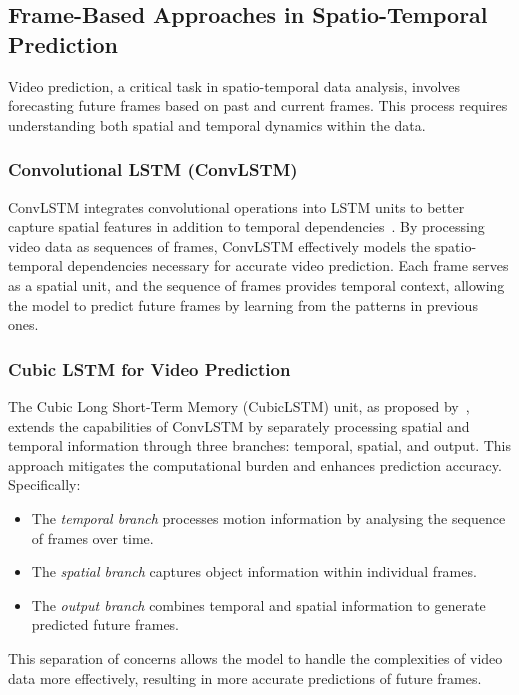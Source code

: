 \documentclass[12pt,oneside]{book} %
\begin{document}
\subsection*{Frame-Based Approaches in Spatio-Temporal Prediction}

Video prediction, a critical task in spatio-temporal data analysis, involves
forecasting future frames based on past and current frames. This process
requires understanding both spatial and temporal dynamics within the data.

\subsubsection*{Convolutional LSTM (ConvLSTM)}

ConvLSTM integrates convolutional operations into LSTM units to better capture
spatial features in addition to temporal dependencies~\cite{ConvLSTM}. By
processing video data as sequences of frames, ConvLSTM effectively models the
spatio-temporal dependencies necessary for accurate video prediction. Each
frame serves as a spatial unit, and the sequence of frames provides temporal
context, allowing the model to predict future frames by learning from the
patterns in previous ones.

\subsubsection*{Cubic LSTM for Video Prediction}

The Cubic Long Short-Term Memory (CubicLSTM) unit, as proposed
by~\citet{CubicLSTMsVideoPrediction}, extends the capabilities of ConvLSTM by
separately processing spatial and temporal information through three branches:
temporal, spatial, and output. This approach mitigates the computational burden
and enhances prediction accuracy. Specifically:
\begin{itemize}
    \item The \textit{temporal branch} processes motion information by analysing the
          sequence of frames over time.
    \item The \textit{spatial branch} captures object information within individual
          frames.
    \item The \textit{output branch} combines temporal and spatial information to
          generate predicted future frames.
\end{itemize}
This separation of concerns allows the model to handle the complexities of video data more effectively, resulting in more accurate predictions of future frames.
\end{document}
